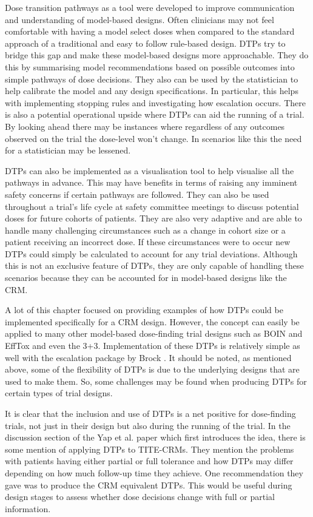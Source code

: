 Dose transition pathways as a tool were developed to improve communication and understanding of model-based designs. Often clinicians may not feel comfortable with having a model select doses when compared to the standard approach of a traditional and easy to follow rule-based design. DTPs try to bridge this gap and make these model-based designs more approachable. They do this by summarising model recommendations based on possible outcomes into simple pathways of dose decisions. They also can be used by the statistician to help calibrate the model and any design specifications. In particular, this helps with implementing stopping rules and investigating how escalation occurs. There is also a potential operational upside where DTPs can aid the running of a trial. By looking ahead there may be instances where regardless of any outcomes observed on the trial the dose-level won't change. In scenarios like this the need for a statistician may be lessened. 

DTPs can also be implemented as a visualisation tool to help visualise all the pathways in advance. This may have benefits in terms of raising any imminent safety concerns if certain pathways are followed. They can also be used throughout a trial's life cycle at safety committee meetings to discuss potential doses for future cohorts of patients. They are also very adaptive and are able to handle many challenging circumstances such as a change in cohort size or a patient receiving an incorrect dose. If these circumstances were to occur new DTPs could simply be calculated to account for any trial deviations. Although this is not an exclusive feature of DTPs, they are only capable of handling these scenarios because they can be accounted for in model-based designs like the CRM. 

A lot of this chapter focused on providing examples of how DTPs could be implemented specifically for a CRM design. However, the concept can easily be applied to many other model-based dose-finding trial designs such as BOIN and EffTox and even the 3+3. Implementation of these DTPs is relatively simple as well with the escalation package by Brock \cite{brockModularApproachDose2020}. It should be noted, as mentioned above, some of the flexibility of DTPs is due to the underlying designs that are used to make them. So, some challenges may be found when producing DTPs for certain types of trial designs. 

It is clear that the inclusion and use of DTPs is a net positive for dose-finding trials, not just in their design but also during the running of the trial. In the discussion section of the Yap et al. \cite{yapDoseTransitionPathways2017} paper which first introduces the idea, there is some mention of applying DTPs to TITE-CRMs. They mention the problems with patients having either partial or full tolerance and how DTPs may differ depending on how much follow-up time they achieve. One recommendation they gave was to produce the CRM equivalent DTPs. This would be useful during design stages to assess whether dose decisions change with full or partial information. 

